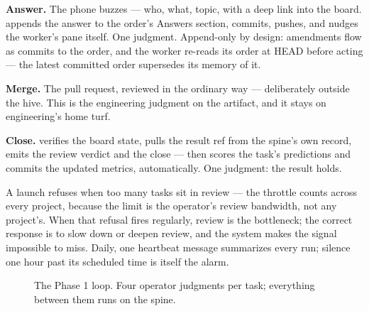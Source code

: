 \textbf{Answer.} The phone buzzes --- who, what, topic, with a deep link into the board.  appends the answer to the order's Answers section, commits, pushes, and nudges the worker's pane itself. One judgment. Append-only by design: amendments flow as commits to the order, and the worker re-reads its order at HEAD before acting --- the latest committed order supersedes its memory of it.

\textbf{Merge.} The pull request, reviewed in the ordinary way --- deliberately outside the hive. This is the engineering judgment on the artifact, and it stays on engineering's home turf.

\textbf{Close.}  verifies the board state, pulls the result ref from the spine's own record, emits the review verdict and the close --- then scores the task's predictions and commits the updated metrics, automatically. One judgment: the result holds.

A launch refuses when too many tasks sit in review --- the throttle counts  across every project, because the limit is the operator's review bandwidth, not any project's. When that refusal fires regularly, review is the bottleneck; the correct response is to slow down or deepen review, and the system makes the signal impossible to miss. Daily, one heartbeat message summarizes every run; silence one hour past its scheduled time is itself the alarm.

\begin{figure}[h]
\centering
{}
\caption{The Phase 1 loop. Four operator judgments per task; everything between them runs on the spine.}
\end{figure}

